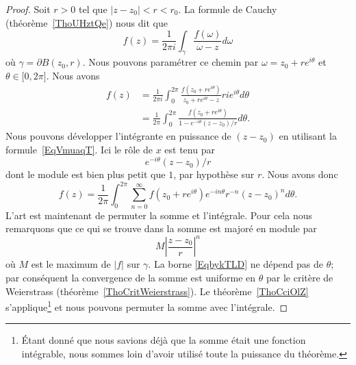 \begin{proof}
	Soit \( r>0\) tel que \( | z-z_0 |<r<r_0\). La formule de Cauchy (théorème~\ref{ThoUHztQe}) nous dit que
	\begin{equation}
		f(z)=\frac{1}{ 2\pi i }\int_{\gamma}\frac{ f(\omega)}{ \omega-z }d\omega
	\end{equation}
	où \( \gamma=\partial B(z_0,r)\). Nous pouvons paramétrer ce chemin par \( \omega=z_0+r e^{i\theta}\) et \( \theta\in \mathopen[ 0 , 2\pi \mathclose]\). Nous avons
	\begin{subequations}
		\begin{align}
			f(z) & =\frac{1}{ 2\pi i }\int_0^{2\pi}\frac{ f(z_0+r e^{i\theta}) }{ z_0+r e^{i\theta}-z }ri e^{i\theta}d\theta \\
			     & =\frac{1}{ 2\pi }\int_0^{2\pi}\frac{ f(z_0+r e^{i\theta}) }{ 1- e^{-i\theta}(z-z_0)/r }d\theta.
		\end{align}
	\end{subequations}
	Nous pouvons développer l'intégrante en puissance de \( (z-z_0)\) en utilisant la formule~\ref{EqVmuaqT}. Ici le rôle de \( x\) est tenu par
	\begin{equation}
		e^{-i\theta}(z-z_0)/r
	\end{equation}
	dont le module est bien plus petit que \( 1\), par hypothèse sur \( r\). Nous avons donc
	\begin{equation}
		f(z)=\frac{1}{ 2\pi }\int_0^{2\pi}\sum_{n=0}^{\infty}f(z_0+r e^{i\theta}) e^{-in\theta}r^{-n}(z-z_0)^nd\theta.
	\end{equation}
	L'art est maintenant de permuter la somme et l'intégrale. Pour cela nous remarquons que ce qui se trouve dans la somme est majoré en module par
	\begin{equation}        \label{EqbykTLD}
		M\left| \frac{ z-z_0 }{ r } \right|^n
	\end{equation}
	où \( M\) est le maximum de \( | f |\) sur \( \gamma\). La borne \eqref{EqbykTLD} ne dépend pas de \( \theta\); par conséquent la convergence de la somme est uniforme en \( \theta\) par le critère de Weierstrass (théorème~\ref{ThoCritWeierstrass}). Le théorème~\ref{ThoCciOlZ} s'applique\footnote{Étant donné que nous savions déjà que la somme était une fonction intégrable, nous sommes loin d'avoir utilisé toute la puissance du théorème.} et nous pouvons permuter la somme avec l'intégrale.


\end{proof}
